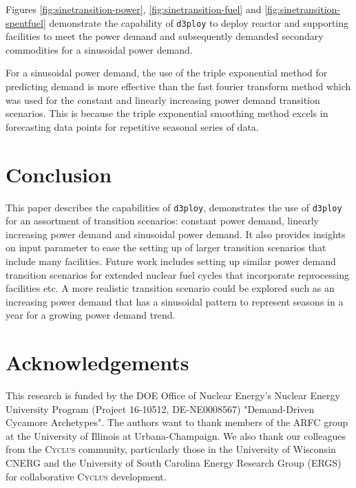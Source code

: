 \documentclass{anstrans}
\newcommand{\Cyclus}{\textsc{Cyclus}\xspace}%
\newcommand{\deploy}{\texttt{d3ploy}\xspace}%
\begin{document}
Figures \ref{fig:sinetransition-power}, \ref{fig:sinetransition-fuel}
and \ref{fig:sinetransition-spentfuel} demonstrate the capability 
of \deploy to deploy reactor and supporting facilities to meet the
power demand and subsequently demanded secondary commodities 
for a sinusoidal power demand. 

For a sinusoidal power demand, the use of the triple exponential method
for predicting demand is more effective than the 
fast fourier transform method which was used for the constant 
and linearly increasing power demand transition scenarios. 
This is because the triple exponential smoothing method excels in
forecasting data points for repetitive seasonal series of data.  

\section{Conclusion}
This paper describes the capabilities of \deploy, demonstrates 
the use of \deploy for an assortment of transition scenarios: 
constant power demand, linearly increasing power demand and
sinusoidal power demand.  
It also provides insights on input parameter to ease the
setting up of larger transition scenarios that include many facilities. 
Future work includes setting up similar power demand transition 
scenarios for extended nuclear fuel cycles that incorporate reprocessing 
facilities etc. 
A more realistic transition scenario could be explored such as an 
increasing power demand that has a sinusoidal pattern to represent 
seasons in a year for a growing power demand trend. 

\nopagebreak
\section{Acknowledgements}
This research is funded by the \gls{DOE} Office of 
Nuclear Energy's Nuclear Energy University Program 
(Project 16-10512, DE-NE0008567) 
"Demand-Driven Cycamore Archetypes". The authors want to thank 
members of the \gls{ARFC} group at the University of Illinois at 
Urbana-Champaign. 
We also thank our colleagues from the \Cyclus community, 
particularly those in the University of Wisconsin 
\gls{CNERG} and the University of South Carolina Energy Research 
Group (ERGS) for collaborative \Cyclus development.

\begin{center}
	
	
\end{center}
\end{document}
